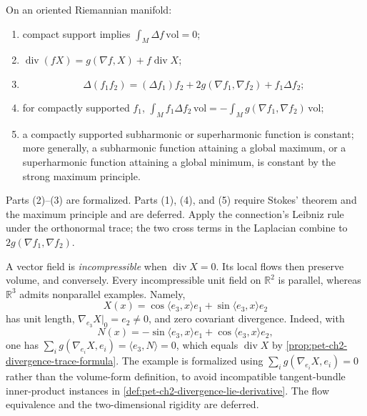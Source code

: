 \begin{remark}
  \label{rem:pet-ch2-ex-27}
  \leanok
  On an oriented Riemannian manifold:
  \begin{enumerate}
    \item compact support implies
      $\int_M\Delta f\,\mathrm{vol}=0$;
    \item
      $\operatorname{div}(fX)
        =g(\nabla f,X)+f\operatorname{div}X$;
    \item
      \[
        \Delta(f_1f_2)
          =(\Delta f_1)f_2+2g(\nabla f_1,\nabla f_2)
           +f_1\Delta f_2;
      \]
    \item for compactly supported $f_1$,
      $\int_Mf_1\Delta f_2\,\mathrm{vol}
       =-\int_Mg(\nabla f_1,\nabla f_2)\,\mathrm{vol}$;
    \item a compactly supported subharmonic or superharmonic function is
      constant; more generally, a subharmonic function attaining a global
      maximum, or a superharmonic function attaining a global minimum, is
      constant by the strong maximum principle.
  \end{enumerate}
  Parts (2)--(3) are formalized. Parts (1), (4), and (5) require Stokes'
  theorem and the maximum principle and are deferred.
  \sketch
  Apply the connection's Leibniz rule under the orthonormal trace; the two
  cross terms in the Laplacian combine to
  $2g(\nabla f_1,\nabla f_2)$.
\end{remark}

\begin{remark}
  \label{rem:pet-ch2-ex-28}
  \leanok
  A vector field is \emph{incompressible} when
  $\operatorname{div}X=0$. Its local flows then preserve volume, and conversely.
  Every incompressible unit field on $\mathbb{R}^2$ is parallel, whereas
  $\mathbb{R}^3$ admits nonparallel examples. Namely,
  \[
    X(x)=\cos\langle e_3,x\rangle e_1
         +\sin\langle e_3,x\rangle e_2
  \]
  has unit length, $\nabla_{e_3}X|_0=e_2\ne0$, and zero covariant divergence.
  Indeed, with
  \[
    N(x)=-\sin\langle e_3,x\rangle e_1
          +\cos\langle e_3,x\rangle e_2,
  \]
  one has $\sum_i g(\nabla_{e_i}X,e_i)=\langle e_3,N\rangle=0$, which equals
  $\operatorname{div}X$ by
  \cref{prop:pet-ch2-divergence-trace-formula}.
  The example is formalized using
  $\sum_i g(\nabla_{e_i}X,e_i)=0$ rather than the volume-form definition, to
  avoid incompatible tangent-bundle inner-product instances in
  \cref{def:pet-ch2-divergence-lie-derivative}. The flow
  equivalence and the two-dimensional rigidity are deferred.
\end{remark}

